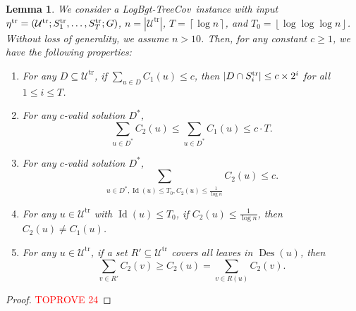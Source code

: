 \documentclass[11pt,a4paper]{article} \usepackage{enumitem}
\newcommand{\floor}[1]{\left\lfloor #1 \right\rfloor}
\newcommand{\ceil}[1]{\left\lceil #1 \right\rceil}
\newcommand{\calU}{\mathcal{U}}
\newcommand{\LBOtreecov}{\textsf{LogBgt-TreeCov}}
\newcommand{\trU}{\operatorname{\calU^{tr}}}
\newcommand{\trS}[1]{\ifx\relax#1\relax
    S^{\operatorname{tr}} \else
    S^{\operatorname{tr}}_{#1} \fi
}
\newcommand{\treta}{\operatorname{\eta^{tr}}}
\newcommand{\Des}{\operatorname{Des}}
\newcommand{\Lev}{\operatorname{Id}}
\newtheorem{lemma}[theorem]{Lemma}
\theoremstyle{definition}
\begin{document}
\begin{lemma}\label{lem:tree-1}
We consider a \LBOtreecov\ instance with input $\treta=(\trU;\trS{1},\ldots,\trS{T};G)$, $n=|\trU|$, $T=\ceil{\log n}$, and $T_0=\floor{\log\log\log n}$. Without loss of generality, we assume $n>10$. Then, for any constant $c\ge 1$, we have the following properties:
\begin{enumerate}[label=(\alph*), format=\normalfont]
\item For any $D\subseteq \trU$, if $\sum_{u\in D} C_1(u)\leq c$, then $|D \cap \trS{i}| \leq c \times 2^i$ for all $1 \leq i \leq T$.

\item For any $c$-valid solution $D^{*}$, $$\sum_{u \in D^*} C_2(u) \leq \sum_{u \in D^*} C_1(u) \leq c \cdot T.$$

\item For any $c$-valid solution $D^{*}$, $$\sum_{u \in D^{*}, \Lev(u)\le T_0, C_2(u) \leq \frac{1}{\log n}} C_2(u) \leq c.$$

\item For any $u\in \trU$ with $\Lev(u)\le T_0$, if $C_2(u) \leq \frac{1}{\log n}$, then $C_2(u) \neq C_1(u)$. 

\item For any $u\in \trU$, if a set $R'\subseteq \trU$ covers all leaves in $\Des(u)$, then 
$$\sum_{v \in R'} C_2(v) \geq C_2(u) = \sum_{v \in R(u)} C_2(v).$$
\end{enumerate}
\end{lemma}
\begin{proof}\textcolor{red}{TOPROVE 24}\end{proof}
\end{document}
